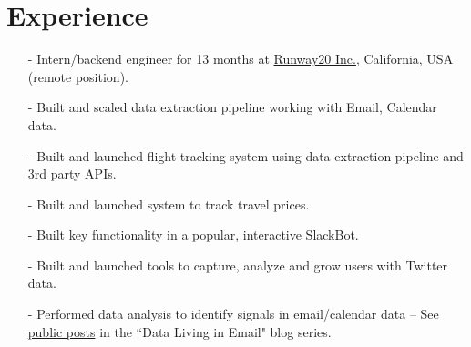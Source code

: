 \documentclass[a4paper, 10pt]{article}
\begin{document}
\vspace*{2mm}
\section{Experience}
\vspace*{2mm}
\vspace*{-1mm}
\begin{itemize}
    \item[-] Intern/backend engineer for 13 months at \href{http://www.weldai.com/}{Runway20 Inc.}, California, USA (remote position).\vspace*{-2mm}
    \item[-] Built and scaled data extraction pipeline working with Email, Calendar data.\vspace*{-2mm}
    \item[-] Built and launched flight tracking system using data extraction pipeline and 3rd party APIs.\vspace*{-2mm}
    \item[-] Built and launched system to track travel prices.\vspace*{-2mm}
    \item[-] Built key functionality in a popular, interactive SlackBot.\vspace*{-2mm}
    \item[-] Built and launched tools to capture, analyze and grow users with Twitter data.\vspace*{-2mm}
    \item[-] Performed data analysis to identify signals in email/calendar data -- See \href{http://www.weldai.com/blog/}{public posts} in the ``Data Living in Email" blog series.
\end{itemize}
\end{document}
